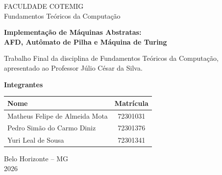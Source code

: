 \documentclass[12pt,a4paper]{article}
\begin{document}
\begin{titlepage}
\begin{center}
{\large FACULDADE COTEMIG}\\[0.2cm]
{\large Fundamentos Teóricos da Computação}

\vspace{4cm}

{\LARGE\textbf{Implementação de Máquinas Abstratas:}}\\[0.4cm]
{\Large\textbf{AFD, Autômato de Pilha e Máquina de Turing}}

\vspace{3cm}

{\large Trabalho Final da disciplina de Fundamentos Teóricos da
Computação, apresentado ao Professor Júlio César da Silva.}

\vspace{2cm}

{\large\textbf{Integrantes}}\\[0.4cm]
\begin{tabular}{lc}
\toprule
\textbf{Nome} & \textbf{Matrícula} \\
\midrule
Matheus Felipe de Almeida Mota & 72301031 \\
Pedro Simão do Carmo Diniz     & 72301376 \\
Yuri Leal de Sousa             & 72301341 \\
\bottomrule
\end{tabular}

\vfill

{\large Belo Horizonte -- MG\\ 2026}
\end{center}
\end{titlepage}

\begin{abstract}
\noindent Este relatório descreve a modelagem e a implementação, em C\# (.NET 6 ou superior),
de três máquinas abstratas da teoria da computação: o Autômato Finito
Determinístico (AFD), o Autômato de Pilha (AP) com aceitação por pilha vazia e a
Máquina de Turing (MT). Cada implementação é uma tradução direta da definição
matemática formal. São apresentados os fundamentos teóricos, as decisões de
projeto, os resultados dos testes obrigatórios e uma análise comparativa do poder
computacional das três máquinas.
\end{abstract}
\newpage
\end{document}
